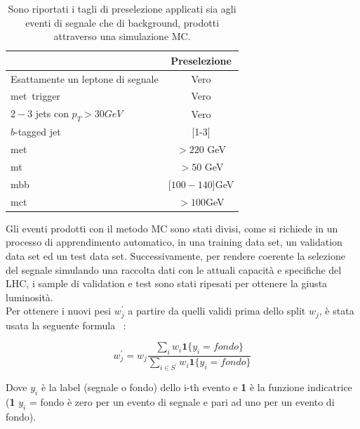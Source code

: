 \begin{table}[h!]
	\centering
	\begin{tabular}{lc}
		\hline
		&Preselezione \\
		\hline
		Esattamente un leptone di segnale&Vero\\
		met\ trigger&Vero\\
		$2-3$ jets con $p_{T}>30 GeV$&Vero\\
		$b$-tagged jet&[1-3]\\
		met\ &$> 220$ GeV\\
		mt\ &$> 50$ GeV\\
		mbb\ &[$100-140$]GeV\\
		mct\ &$>100$GeV\\
		\hline
	\end{tabular}
	\caption{Sono riportati i tagli di preselezione applicati sia agli eventi di segnale che di background, prodotti attraverso una simulazione MC.}
	\label{tab:tagli di preselezione}
\end{table} 
Gli eventi prodotti con il metodo MC sono stati divisi, come si richiede in un processo di apprendimento automatico, in una training data set, un validation data set ed un test data set. Successivamente, per rendere coerente la selezione del segnale simulando una raccolta dati con le attuali capacità e specifiche del LHC, i sample di validation e test sono stati ripesati per ottenere la giusta luminosità.\\
Per ottenere i nuovi pesi $w_{j}^{'}$ a partire da quelli validi prima dello split $w_{j}$, è stata usata la seguente formula ~\cite{HiggsChalllenge}:

\begin{equation}\label{eq:ripesaggio}
    w_j^{'}=  w_{j}\frac{\sum_{i} w_{i} \textbf{1} \lbrace y_{i}=fondo\rbrace }{\sum_{i\in S^{'}}w_{i} \textbf{1} \lbrace y_{i}=fondo\rbrace }  
\end{equation}

Dove $y_{i}$ è la label (segnale o fondo) dello i-th evento e \textbf{1} è la funzione indicatrice (\textbf{1} {$y_{i}$ = fondo} è zero per un evento di segnale e pari ad uno per un evento di fondo).


